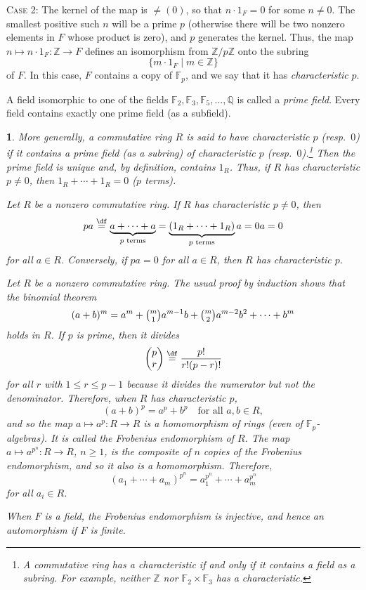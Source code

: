 \documentclass[a4paper,11pt,final,openany]{memoir}
\newtheorem{plain}[X]{}
\theoremstyle{nonumberplain}
\begin{document}
\textsc{Case 2:}\emph{\/} The kernel of the map is $\neq(0)$, so that
$n\cdot1_{F}=0$ for some $n\neq0$. The smallest positive such $n$ will be a
prime $p$ (otherwise there will be two nonzero elements in $F$ whose product
is zero), and $p$ generates the kernel. Thus, the map $n\mapsto n\cdot
1_{F}\colon\mathbb{Z}{}\rightarrow F$ defines an isomorphism from
$\mathbb{Z}/p\mathbb{Z}{}$ onto the subring
\[
\{m\cdot1_{F}\mid m\in\mathbb{Z}\}
\]
of $F$. In this case, $F$ contains a copy of $\mathbb{F}_{p}$, and we say that
it has \emph{characteristic} $p$.%
%


A field isomorphic to one of the fields $\mathbb{F}_{2},\mathbb{F}{}%
_{3},\mathbb{F}{}_{5},\ldots,\mathbb{Q}$ is called a \emph{prime field}.%
Every field contains exactly one prime field (as a subfield).

\begin{plain}
\label{ef3}More generally, a commutative ring $R$ is said to have
\emph{characteristic} $p$ (resp.~$0$) if it contains a prime field (as a
subring) of characteristic $p$ (resp.~$0$).\footnote{A commutative ring has a
characteristic if and only if it contains a field as a subring. For example,
neither $\mathbb{Z}{}$ nor $\mathbb{F}{}_{2}\times\mathbb{F}{}_{3}$ has a
characteristic.} Then the prime field is unique and, by definition, contains
$1_{R}$. Thus, if $R$ has characteristic $p\neq0$, then $1_{R}+\cdots+1_{R}=0$
($p$ terms).

Let $R$ be a nonzero commutative ring. If $R$ has characteristic $p\neq0$,
then%
\[
pa\overset{\df}{=}\underbrace{a+\cdots+a}_{p\text{ terms}%
}=\underbrace{(1_{R}+\cdots+1_{R})}_{p\text{ terms}}a=0a=0
\]
for all $a\in R$. Conversely, if $pa=0$ for all $a\in R$, then $R$ has
characteristic $p$.

Let $R$ be a nonzero commutative ring. The usual proof by induction shows that
the binomial theorem%
\[
(a+b)^{m}=a^{m}+\tbinom{m}{1}a^{m-1}b+\tbinom{m}{2}a^{m-2}b^{2}+\cdots+b^{m}%
\]
holds in $R$. If $p$ is prime, then it divides%
\[%
\begin{pmatrix}
p\\
r
\end{pmatrix}
\overset{\df}{=}\frac{p!}{r!(p-r)!}%
\]
for all $r$ with $1\leq r\leq p-1$ because it divides the numerator but not
the denominator. Therefore, when $R$ has characteristic $p$,
\[
(a+b)^{p}=a^{p}+b^{p}\quad\text{for all }a,b\in R,
\]
and so the map $a\mapsto a^{p}\colon R\rightarrow R$ is a homomorphism of
rings (even of $\mathbb{F}{}_{p}$-algebras). It is called the \emph{Frobenius
endomorphism\/}%
of $R$. The map $a\mapsto a^{p^{n}}\colon R\rightarrow R$, $n\geq1$, is the
composite of $n$ copies of the Frobenius endomorphism, and so it also is a
homomorphism. Therefore,%
\[
(a_{1}+\cdots+a_{m})^{p^{n}}=a_{1}^{p^{n}}+\cdots+a_{m}^{p^{n}}%
\]
for all $a_{i}\in R$.

When $F$ is a field, the Frobenius endomorphism is injective, and hence an
automorphism if $F$ is finite.
\end{plain}
\end{document}
